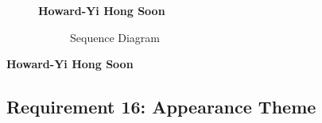 \documentclass{article}
\begin{document}
		\newpage

		\begin{figure}[htbp]
			\textbf{Howard-Yi Hong Soon}
			\centering
			\begin{subfigure}{\textwidth}
				{}
				\caption{Sequence Diagram}
			\end{subfigure}
			\begin{subfigure}{\textwidth}
			\end{subfigure}
		\end{figure}
		\newpage

		\textbf{Howard-Yi Hong Soon}
		\subsection{Requirement 16: Appearance Theme}
\end{document}

